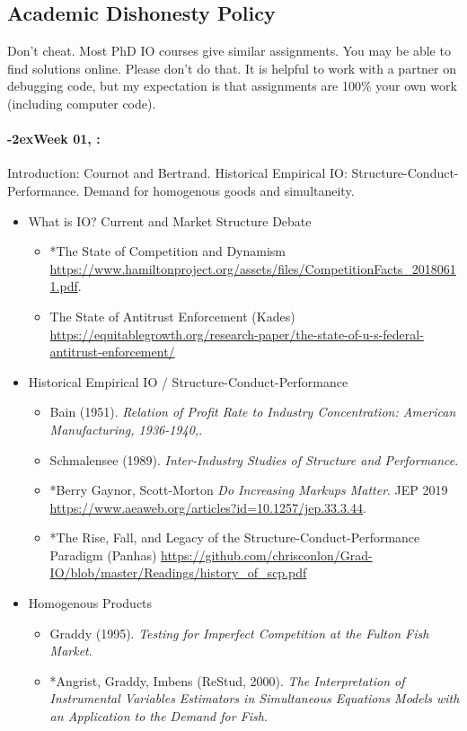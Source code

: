 \documentclass[11pt]{article}
\newcommand{\week}[1]{%
  \sbox{\weekdatebox}{\syldate{\today}}%
  \paragraph*{\kern-2ex\quad #1, \usebox{\weekdatebox}:}%
  \AdvanceDate[7]%
}
\begin{document}
\subsection*{Academic Dishonesty Policy}
Don't cheat. Most PhD IO courses give similar assignments. You may be able to find solutions online. Please don't do that. It is helpful to work with a partner on debugging code, but my expectation is that assignments are 100\% your own work (including computer code).
\newpage
\SetDate[03/09/2026]
\week{Week 01} Introduction: Cournot and Bertrand. Historical Empirical IO: Structure-Conduct-Performance. Demand for homogenous goods and simultaneity.
\begin{itemize}
\item What is IO? Current and Market Structure Debate
\begin{itemize}
\item *The State of Competition and Dynamism \url{https://www.hamiltonproject.org/assets/files/CompetitionFacts_20180611.pdf}.
\item The State of Antitrust Enforcement (Kades) \url{https://equitablegrowth.org/research-paper/the-state-of-u-s-federal-antitrust-enforcement/}
\end{itemize}
\item Historical Empirical IO / Structure-Conduct-Performance
\begin{itemize}
\item Bain (1951). \textit{Relation of Profit Rate to Industry Concentration: American Manufacturing, 1936-1940,}.
\item Schmalensee (1989). \textit{Inter-Industry Studies of Structure and Performance}.
\item *Berry Gaynor, Scott-Morton \textit{Do Increasing Markups Matter}. JEP 2019 \url{https://www.aeaweb.org/articles?id=10.1257/jep.33.3.44}.
\item *The Rise, Fall, and Legacy of the Structure-Conduct-Performance Paradigm (Panhas) \url{https://github.com/chrisconlon/Grad-IO/blob/master/Readings/history_of_scp.pdf}
\end{itemize}
\item Homogenous Products
\begin{itemize}
\item Graddy (1995). \textit{Testing for Imperfect Competition at the Fulton Fish Market}.
\item *Angrist, Graddy, Imbens (ReStud, 2000). \textit{The Interpretation of Instrumental Variables Estimators in Simultaneous Equations Models with an Application to the Demand for Fish}.
\end{itemize}
\end{itemize}
\end{document}
